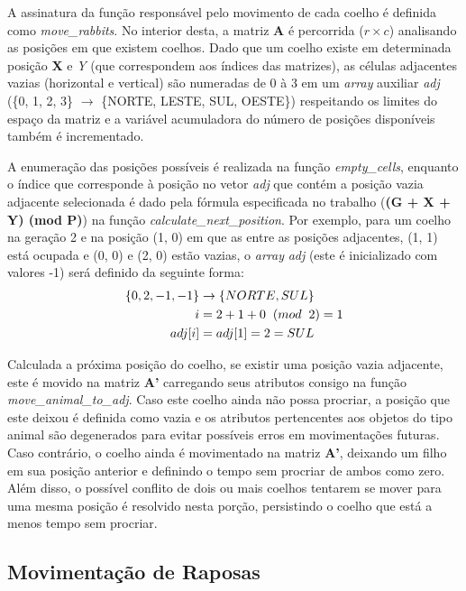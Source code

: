 \documentclass[a4paper, 12pt]{article}
\begin{document}
A assinatura da função responsável pelo movimento de cada coelho é definida como \emph{move\_rabbits}. No interior desta, a matriz \textbf{A} é percorrida (\(r \times c\)) analisando as posições em que existem coelhos. Dado que um coelho existe em determinada posição \textbf{X} e \emph{Y} (que correspondem aos índices das matrizes), as células adjacentes vazias (horizontal e vertical) são numeradas de 0 à 3 em um \emph{array} auxiliar \emph{adj} (\{0, 1, 2, 3\} \(\rightarrow\) \{NORTE, LESTE, SUL, OESTE\}) respeitando os limites do espaço da matriz e a variável acumuladora do número de posições disponíveis também é incrementado.

A enumeração das posições possíveis é realizada na função \emph{empty\_cells}, enquanto o índice que corresponde à posição no vetor \emph{adj} que contém a posição vazia adjacente selecionada é dado pela fórmula especificada no trabalho (\textbf{(G + X + Y) (mod P)}) na função \emph{calculate\_next\_position}. Por exemplo, para um coelho na geração 2 e na posição (1, 0) em que as entre as posições adjacentes, (1, 1) está ocupada e (0, 0) e (2, 0) estão vazias, o \emph{array} \emph{adj} (este é inicializado com valores -1) será definido da seguinte forma:
\begin{align*}
    \{0, 2, -1, -1\} & \rightarrow \{NORTE, SUL\}\\
    i & = 2 + 1 + 0 \hspace{0.2cm}(mod \hspace{0.2cm}2) = 1\\
    adj[i] & = adj[1] = 2 = SUL
\end{align*}

Calculada a próxima posição do coelho, se existir uma posição vazia adjacente, este é movido na matriz \textbf{A'} carregando seus atributos consigo na função \emph{move\_animal\_to\_adj}. Caso este coelho ainda não possa procriar, a posição que este deixou é definida como vazia e os atributos pertencentes aos objetos do tipo animal são degenerados para evitar possíveis erros em movimentações futuras. Caso contrário, o coelho ainda é movimentado na matriz \textbf{A'}, deixando um filho em sua posição anterior e definindo o tempo sem procriar de ambos como zero. Além disso, o possível conflito de dois ou mais coelhos tentarem se mover para uma mesma posição é resolvido nesta porção, persistindo o coelho que está a menos tempo sem procriar.

\subsection{Movimentação de Raposas}
\end{document}

